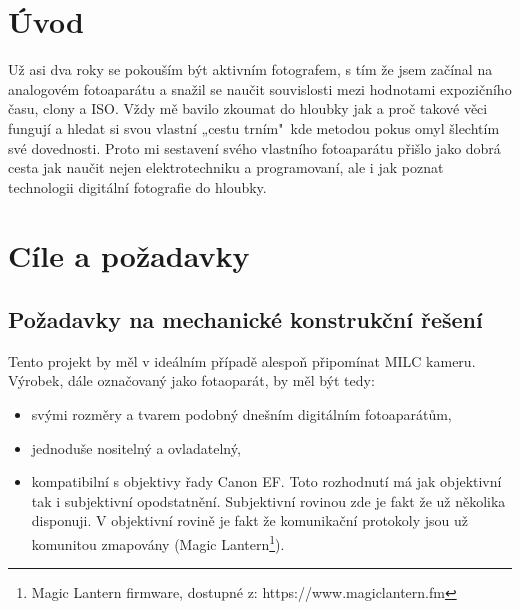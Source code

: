 \documentclass[12pt, a4paper, oneside]{report}
\begin{document}
\newpage

\chapter*{Úvod}
Už asi dva roky se pokouším být aktivním fotografem, s tím že jsem začínal na analogovém fotoaparátu a snažil se naučit souvislosti mezi hodnotami expozičního času, clony a ISO. Vždy mě bavilo zkoumat do hloubky jak a proč takové věci fungují a hledat si svou vlastní „cestu trním"~kde metodou pokus omyl šlechtím své dovednosti. Proto mi sestavení svého vlastního fotoaparátu přišlo jako dobrá cesta jak naučit nejen elektrotechniku a programovaní, ale i jak poznat technologii digitální fotografie do hloubky.

\chapter{Cíle a požadavky}
\section{Požadavky na mechanické konstrukční řešení}
Tento projekt by měl v ideálním případě alespoň připomínat MILC kameru. Výrobek, dále označovaný jako fotaoparát, by měl být tedy:
\begin{itemize}
    \item svými rozměry a tvarem podobný dnešním digitálním fotoaparátům,
    \item jednoduše nositelný a ovladatelný,
    \item kompatibilní s objektivy řady Canon EF. Toto rozhodnutí má jak objektivní tak i subjektivní opodstatnění. Subjektivní rovinou zde je fakt že už několika disponuji. V objektivní rovině je fakt že komunikační protokoly jsou už komunitou zmapovány (Magic Lantern\footnote{Magic Lantern firmware, dostupné z: https://www.magiclantern.fm}).
\end{itemize}
\end{document}
